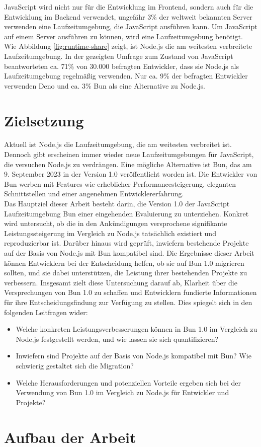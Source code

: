\noindent
JavaScript wird nicht nur für die Entwicklung im Frontend, sondern auch für die Entwicklung im Backend 
verwendet, ungefähr 3\% der weltweit bekannten Server verwenden eine Laufzeitumgebung, die JavaScript 
ausführen kann. \cite{QSuccess.2023} Um JavaScript auf einem Server ausführen zu können, wird eine Laufzeitumgebung benötigt. Wie Abbildung \ref{fig:runtime-share} zeigt, ist Node.js die am weitesten verbreitete Laufzeitumgebung. In der gezeigten Umfrage zum Zustand von JavaScript beantworteten ca. 71\% von 30.000 befragten Entwickler, dass sie Node.js als Laufzeitumgebung regelmäßig verwenden.
Nur ca. 9\% der befragten Entwickler verwenden Deno und ca. 3\% Bun als eine Alternative zu Node.js. \cite{Greif.2022}


\section{Zielsetzung}
Aktuell ist Node.js die Laufzeitumgebung, die am weitesten verbreitet ist. Dennoch gibt erscheinen immer wieder neue Laufzeitumgebungen für JavaScript, die versuchen Node.js zu verdrängen. Eine mögliche Alternative ist Bun, das am 9. September 2023 in der Version 1.0 veröffentlicht worden ist. Die Entwickler von Bun werben mit Features wie erheblicher Performancesteigerung, eleganten Schnittstellen und einer angenehmen Entwicklererfahrung. \cite{Sumner.2023} \\

\noindent
Das Hauptziel dieser Arbeit besteht darin, die Version 1.0 der JavaScript Laufzeitumgebung Bun einer eingehenden Evaluierung zu unterziehen. Konkret wird untersucht, ob die in den Ankündigungen versprochene signifikante Leistungssteigerung im Vergleich zu Node.js tatsächlich existiert und reproduzierbar ist. Darüber hinaus wird geprüft, inwiefern bestehende Projekte auf der Basis von Node.js mit Bun kompatibel sind. Die Ergebnisse dieser Arbeit können Entwicklern bei der Entscheidung helfen, ob sie auf Bun 1.0 migrieren sollten, und sie dabei unterstützen, die Leistung ihrer bestehenden Projekte zu verbessern. Insgesamt zielt diese Untersuchung darauf ab, Klarheit über die Versprechungen von Bun 1.0 zu schaffen und Entwicklern fundierte Informationen für ihre Entscheidungsfindung zur Verfügung zu stellen. Dies spiegelt sich in den folgenden Leitfragen wider:
\begin{itemize}
    \item Welche konkreten Leistungsverbesserungen können in Bun 1.0 im Vergleich zu Node.js festgestellt werden, und wie lassen sie sich quantifizieren?
    \item Inwiefern sind Projekte auf der Basis von Node.js kompatibel mit Bun? Wie schwierig gestaltet sich die Migration?
    \item Welche Herausforderungen und potenziellen Vorteile ergeben sich bei der Verwendung von Bun 1.0 im Vergleich zu Node.js für Entwickler und Projekte?
\end{itemize}

\section{Aufbau der Arbeit}



